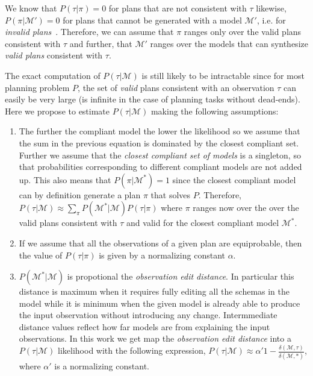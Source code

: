 \documentclass[letterpaper]{article} %
\begin{document}
We know that $P(\tau|\mathcal{\pi})=0$ for plans that are not consistent with $\tau$ likewise, $P(\mathcal{\pi}|\mathcal{M'})=0$ for plans that cannot be generated with a model $\mathcal{M'}$, i.e. for {\em invalid plans}~\cite{howey2004val}. Therefore, we can assume that $\pi$ ranges only over the valid plans consistent with $\tau$ and further, that $\mathcal{M}'$ ranges over the models that can synthesize {\em valid plans} consistent with $\tau$.

The exact computation of $P(\tau|\mathcal{M})$ is still likely to be intractable since for most planning problem $P$, the set of {\em valid} plans consistent with an observation $\tau$ can easily be very large (is infinite in the case of planning tasks without dead-ends). Here we propose to estimate $P(\tau|\mathcal{M})$ making the following assumptions:
\begin{enumerate}
\item The further the compliant model the lower the likelihood so we assume that the sum in the previous equation is dominated by the closest compliant set. Further we assume that the {\em closest compliant set of models} is a singleton, so that probabilities corresponding to different compliant models are not added up. This also means that $P(\pi|\mathcal{M^*})=1$ since the closest compliant model can by definition generate a plan $\pi$ that solves $P$. Therefore, $\displaystyle P(\tau|\mathcal{M}) \approx \sum_{\pi} P(\mathcal{M^*}|\mathcal{M})P(\tau|\mathcal{\pi})$ where $\pi$ ranges now over the over the valid plans consistent with $\tau$ and valid for the closest compliant model $\mathcal{M^*}$.

\item If we assume that all the observations of a given plan are equiprobable, then the value of $P(\tau|\mathcal{\pi})$ is given by a normalizing constant $\alpha$.

\item $P(\mathcal{M^*}|\mathcal{M})$ is propotional the {\em observation edit distance}. In particular this distance is maximum when it requires fully editing all the schemas in the model while it is minimum when the given model is already able to produce the input observation without introducing any change. Intermmediate distance values reflect how far models are from explaining the input observations. In this work we get map the {\em observation edit distance} into a $P(\tau|\mathcal{M})$ likelihood with the following expression, $P(\tau|\mathcal{M}) \approx \alpha' 1-\frac{\delta(\mathcal{M},\tau)}{\delta(\mathcal{M},*)}$, where $\alpha'$ is a normalizing constant.
\end{enumerate}
\end{document}
